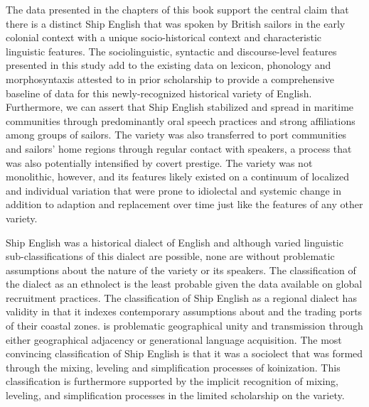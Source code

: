 The data presented in the chapters of this book support the central claim that there is a distinct Ship English that was spoken by British sailors in the early colonial context with a unique socio-historical context and characteristic linguistic features. The sociolinguistic, syntactic and discourse-level features presented in this study add to the existing data on lexicon, phonology and morphosyntaxis attested to in prior scholarship to provide a comprehensive baseline of data for this newly-recognized historical variety of English. Furthermore, we can assert that Ship English stabilized and spread in maritime communities through predominantly oral speech practices and strong affiliations among groups of sailors. The variety was also transferred to port communities and sailors’ home regions through regular contact with speakers, a process that was also potentially intensified by covert prestige. The variety was not monolithic, however, and its features likely existed on a continuum of localized and individual variation that were prone to idiolectal and systemic change in addition to adaption and replacement over time just like the features of any other variety. 

Ship English was a historical dialect of English and although varied linguistic sub-classifications of this dialect are possible, none are without problematic assumptions about the nature of the variety or its speakers. The classification of the dialect as an ethnolect is the least probable given the data available on global recruitment practices. The classification of Ship English as a regional dialect has validity in that it indexes contemporary assumptions about  and the trading ports of their coastal zones.  is problematic geographical unity and transmission through either geographical adjacency or generational language acquisition. The most convincing classification of Ship English is that it was a sociolect that was formed through the mixing, leveling and simplification processes of koinization. This classification is furthermore supported by the implicit recognition of mixing, leveling, and simplification processes in the limited scholarship on the variety.

